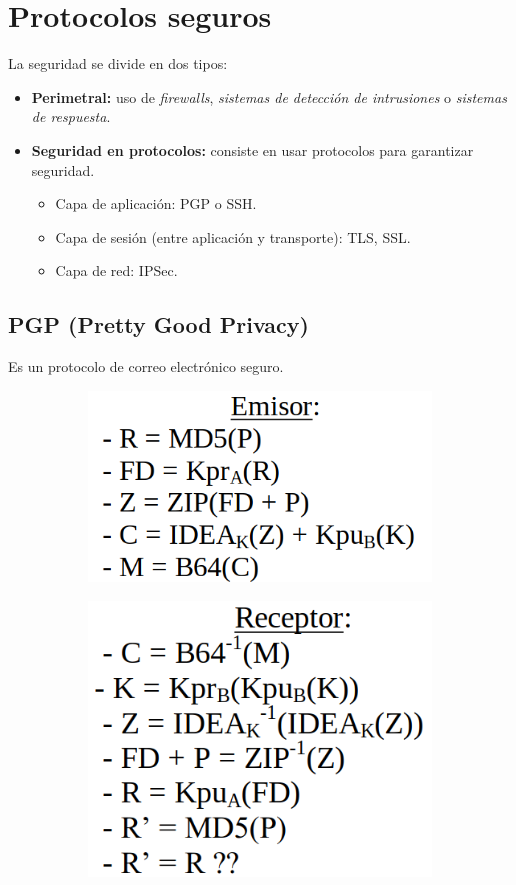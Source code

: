 \section{Protocolos seguros}
La seguridad se divide en dos tipos:
\begin{itemize}
    \item \textbf{Perimetral:} uso de \textit{firewalls}, \textit{sistemas de detección de intrusiones} o \textit{sistemas de respuesta}.
    \item \textbf{Seguridad en protocolos:} consiste en usar protocolos para garantizar seguridad.
        \begin{itemize}
            \item Capa de aplicación: PGP o SSH\@.
            \item Capa de sesión (entre aplicación y transporte): TLS\@, SSL\@.
            \item Capa de red: IPSec\@.
        \end{itemize}
\end{itemize}

\subsection{PGP (Pretty Good Privacy)}

Es un protocolo de correo electrónico seguro. 

\begin{figure}[H]
    \centering
    \begin{subfigure}[b]{0.45\linewidth}
        \centering
        \includegraphics[width=0.6\linewidth]{./images/pgp-emisor.png}
        \label{fig:pgp-emisor}
    \end{subfigure}
    \hfill
    \begin{subfigure}[b]{0.45\linewidth}
        \centering
        \includegraphics[width=0.6\linewidth]{./images/pgp-receptor.png}
        \label{fig:pgp-receptor}
    \end{subfigure}
\end{figure}

